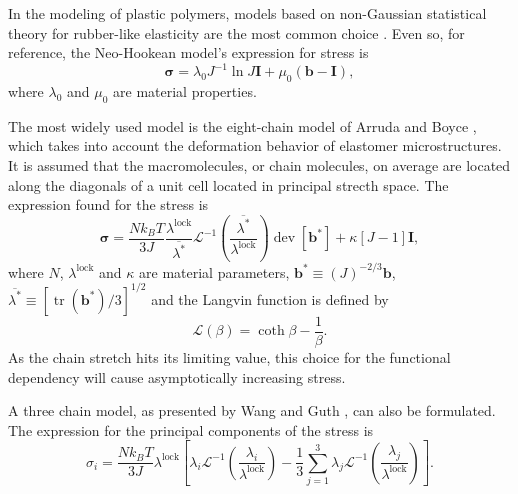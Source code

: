 In the modeling of plastic polymers, models based on non-Gaussian statistical theory for rubber-like elasticity are the most common choice \citep{holzapfelNonlinearSolidMechanics2000}.
Even so, for reference, the Neo-Hookean model's expression for stress is
\begin{equation}
	\bm \sigma = \lambda_0 J^{-1}\ln J \mathbf{I}+\mu_0\left(\mathbf{b}-\mathbf{I}\right),
\end{equation}
where $\lambda_0$ and $\mu_0$ are material properties.

The most widely used model is the eight-chain model of Arruda and Boyce \citep{arrudaEvolutionPlasticAnisotropy1993, arrudaEffectsStrainRate1995}, which takes into account the deformation behavior of elastomer microstructures.
It is assumed that the macromolecules, or chain molecules, on average are located along the diagonals of a unit cell located in principal strecth space.
The expression found for the stress is
\begin{equation}
	\label{eq:eigth_chain_model}
	\bm \sigma = \frac{Nk_BT}{3J} \frac{\lambda^\text{lock}}{\overline{\lambda^*}}\mathcal L^{-1}\left(\frac{\overline{\lambda^*}}{\lambda^\text{lock}}\right)\operatorname{dev} [\mathbf b^*] + \kappa [J-1]\mathbf I,
\end{equation}
where $N$, $\lambda^\text{lock}$ and $\kappa$ are material parameters, $\mathbf b^*\equiv (J)^{-2/3}\mathbf b$, $\overline{\lambda^*}\equiv [\operatorname{tr}(\mathbf b^*)/3]^{1/2}$ and the Langvin function is defined by
\begin{equation}
	\mathcal L(\beta) = \coth \beta - \frac{1}{\beta}.
\end{equation}
As the chain stretch hits its limiting value, this choice for the functional dependency will cause asymptotically increasing stress.

A three chain model, as presented by Wang and Guth \citep{wangStatisticalTheoryNetworks1952}, can also be formulated.
The expression for the principal components of the stress is
\begin{equation}
	\label{eq:three_chain_model}
	\sigma_i=\frac{Nk_B T}{3J} \lambda^\text{lock} \left[\lambda_i \mathcal L^{-1}\left(\frac{\lambda_i}{\lambda^\text{lock}}\right) - \frac{1}{3} \sum_{j=1}^3 \lambda_j \mathcal L^{-1}\left(\frac{\lambda_j}{\lambda^\text{lock}}\right)\right].
\end{equation}

